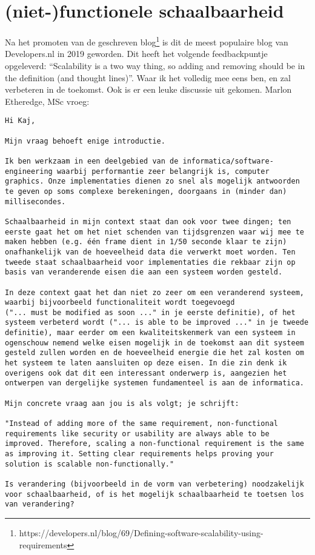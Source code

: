 \section{(niet-)functionele schaalbaarheid}

\label{feedbackschaalbaarheid}

Na het promoten van de geschreven blog\footnote{https://developers.nl/blog/69/Defining-software-scalability-using-requirements} is dit de meest populaire blog van Developers.nl in 2019 geworden. Dit heeft het volgende feedbackpuntje opgeleverd: \enquote{Scalability is a two way thing, so adding and removing should be in the definition (and thought lines)}. Waar ik het volledig mee eens ben, en zal verbeteren in de toekomst. Ook is er een leuke discussie uit gekomen. Marlon Etheredge, MSc vroeg:
\begin{verbatim}
Hi Kaj,

Mijn vraag behoeft enige introductie.

Ik ben werkzaam in een deelgebied van de informatica/software-engineering waarbij performantie zeer belangrijk is, computer graphics. Onze implementaties dienen zo snel als mogelijk antwoorden te geven op soms complexe berekeningen, doorgaans in (minder dan) millisecondes.

Schaalbaarheid in mijn context staat dan ook voor twee dingen; ten eerste gaat het om het niet schenden van tijdsgrenzen waar wij mee te maken hebben (e.g. één frame dient in 1/50 seconde klaar te zijn) onafhankelijk van de hoeveelheid data die verwerkt moet worden. Ten tweede staat schaalbaarheid voor implementaties die rekbaar zijn op basis van veranderende eisen die aan een systeem worden gesteld.

In deze context gaat het dan niet zo zeer om een veranderend systeem, waarbij bijvoorbeeld functionaliteit wordt toegevoegd
("... must be modified as soon ..." in je eerste definitie), of het systeem verbeterd wordt ("... is able to be improved ..." in je tweede definitie), maar eerder om een kwaliteitskenmerk van een systeem in ogenschouw nemend welke eisen mogelijk in de toekomst aan dit systeem gesteld zullen worden en de hoeveelheid energie die het zal kosten om het systeem te laten aansluiten op deze eisen. In die zin denk ik
overigens ook dat dit een interessant onderwerp is, aangezien het ontwerpen van dergelijke systemen fundamenteel is aan de informatica.

Mijn concrete vraag aan jou is als volgt; je schrijft:

"Instead of adding more of the same requirement, non-functional requirements like security or usability are always able to be improved. Therefore, scaling a non-functional requirement is the same as improving it. Setting clear requirements helps proving your solution is scalable non-functionally."

Is verandering (bijvoorbeeld in de vorm van verbetering) noodzakelijk voor schaalbaarheid, of is het mogelijk schaalbaarheid te toetsen los van verandering?
\end{verbatim}
